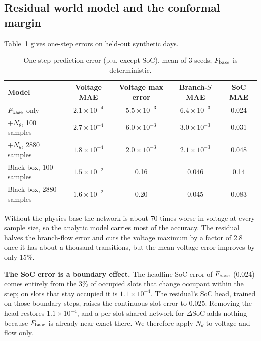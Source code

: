 \documentclass[11pt]{article}
\begin{document}
\subsection{Residual world model and the conformal margin}\label{sec:wm}
Table~\ref{tab:wm} gives one-step errors on held-out synthetic days.
\begin{table}[h]\centering\small
\begin{tabular}{@{}lcccc@{}}\toprule Model & Voltage MAE & Voltage max error & Branch-$S$ MAE & SoC MAE\\\midrule
$F_{\rm base}$ only & $2.1\times10^{-4}$ & $5.5\times10^{-3}$ & $6.4\times10^{-3}$ & 0.024\\
$+N_\theta$, 100 samples & $2.7\times10^{-4}$ & $6.0\times10^{-3}$ & $3.0\times10^{-3}$ & 0.031\\
$+N_\theta$, 2880 samples & $1.8\times10^{-4}$ & $2.0\times10^{-3}$ & $2.1\times10^{-3}$ & 0.048\\
Black-box, 100 samples & $1.5\times10^{-2}$ & 0.16 & 0.046 & 0.14\\
Black-box, 2880 samples & $1.6\times10^{-2}$ & 0.20 & 0.045 & 0.083\\\bottomrule
\end{tabular}\caption{One-step prediction error (p.u. except SoC), mean of 3 seeds; $F_{\rm base}$ is deterministic.}\label{tab:wm}\end{table}
Without the physics base the network is about 70 times worse in voltage at every sample size, so the analytic model carries most of the accuracy. The residual halves the branch-flow error and cuts the voltage maximum by a factor of 2.8 once it has about a thousand transitions, but the mean voltage error improves by only 15\%.

\textbf{The SoC error is a boundary effect.} The headline SoC error of $F_{\rm base}$ (0.024) comes entirely from the 3\% of occupied slots that change occupant within the step; on slots that stay occupied it is $1.1\times10^{-4}$. The residual's SoC head, trained on those boundary steps, raises the continuous-slot error to 0.025. Removing the head restores $1.1\times10^{-4}$, and a per-slot shared network for $\Delta$SoC adds nothing because $F_{\rm base}$ is already near exact there. We therefore apply $N_\theta$ to voltage and flow only.
\end{document}
